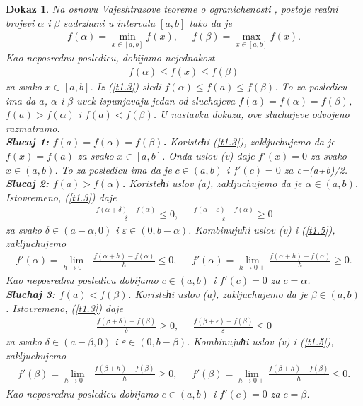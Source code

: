 \documentclass[12pt,a4paper]{article}
\newtheorem*{dokaz}{Dokaz}
\begin{document}
 \begin{dokaz}
 Na osnovu Vajeshtrasove teoreme o ogranichenosti
 \cite[Teorema 14, Glava 5]{kadelburg1}, 
 postoje realni brojevi $\alpha$ i $\beta$ sadrzhani u 
 intervalu $[a,b]$ tako da je 
 \begin{align}\label{t1.1}
     f(\alpha)=\min_{x\in[a,b]}f(x), 
     \;\;\;\;\; 
     f(\beta)=\max_{x\in[a,b]}f(x). 
 \end{align}
 Kao neposrednu posledicu, dobijamo nejednakost
 \begin{align}\label{t1.3}
     f(\alpha)\leq f(x)\leq f(\beta)
 \end{align}
 za svako $x\in[a,b]$. 
 Iz (\ref{t1.3}) sledi $f(\alpha)\leq f(a)\leq f(\beta)$. 
 To za posledicu ima da 
 $a$, $\alpha$ i $\beta$ uvek ispunjavaju jedan od 
 sluchajeva $f(a)=f(\alpha)=f(\beta)$, $f(a)>f(\alpha)$ i 
 $f(a)<f(\beta)$. 
 U nastavku dokaza, ove sluchajeve odvojeno razmatramo. 
 \\
 {\bf\em Slucaj 1: $f(a)=f(\alpha)=f(\beta)$. }
 Koristeћi (\ref{t1.3}), zakljuchujemo da je 
 $f(x)=f(a)$ za svako $x\in[a,b]$. 
 Onda uslov (v) daje $f'(x)=0$ za svako $x\in(a,b)$. 
 To za posledicu ima da je $c\in(a,b)$ i $f'(c)=0$ za c=(a+b)/2. 
 \\
 {\bf\em Slucaj 2: $f(a)>f(\alpha)$. }
 Koristeћi uslov (a), zakljuchujemo da je $\alpha\in(a,b)$. 
 Istovremeno, (\ref{t1.3}) daje 
 \begin{align}\label{t1.5}
     \frac{f(\alpha+\delta)-f(\alpha)}{\delta}
     \leq 0, 
     \;\;\;\;\; 
     \frac{f(\alpha+\varepsilon)-f(\alpha)}{\varepsilon}
     \geq 0
 \end{align}
 za svako $\delta\in(a-\alpha,0)$ i $\varepsilon\in(0,b-\alpha)$. 
 Kombinujuћi uslov (v) i (\ref{t1.5}), zakljuchujemo 
 \begin{align*}
     f'(\alpha)
     =
     \lim_{h\rightarrow 0-}
     \frac{f(\alpha+h)-f(\alpha)}{h}
     \leq 0, 
     \;\;\;\;\; 
     f'(\alpha)
     =
     \lim_{h\rightarrow 0+}
     \frac{f(\alpha+h)-f(\alpha)}{h}
     \geq 0. 
 \end{align*}
 Kao neposrednu posledicu dobijamo $c\in(a,b)$ i $f'(c)=0$
 za $c=\alpha$. 
 \\
 {\bf\em Sluchaj 3: $f(a)<f(\beta)$. }
 Koristeћi uslov (a), zakljuchujemo da je $\beta\in(a,b)$. 
 Istovremeno, (\ref{t1.3}) daje 
 \begin{align}\label{t1.7}
     \frac{f(\beta+\delta)-f(\beta)}{\delta}
     \geq 0, 
     \;\;\;\;\; 
     \frac{f(\beta+\varepsilon)-f(\beta)}{\varepsilon}
     \leq 0
 \end{align}
 za svako $\delta\in(a-\beta,0)$ i $\varepsilon\in(0,b-\beta)$. 
 Kombinujuћi uslov (v) i (\ref{t1.5}), zakljuchujemo 
 \begin{align*}
     f'(\beta)
     =
     \lim_{h\rightarrow 0-}
     \frac{f(\beta+h)-f(\beta)}{h}
     \geq 0, 
     \;\;\;\;\; 
     f'(\beta)
     =
     \lim_{h\rightarrow 0+}
     \frac{f(\beta+h)-f(\beta)}{h}
     \leq 0. 
 \end{align*}
 Kao neposrednu posledicu dobijamo $c\in(a,b)$ i $f'(c)=0$
 za $c=\beta$. 
 \end{dokaz}
 
\end{document}
